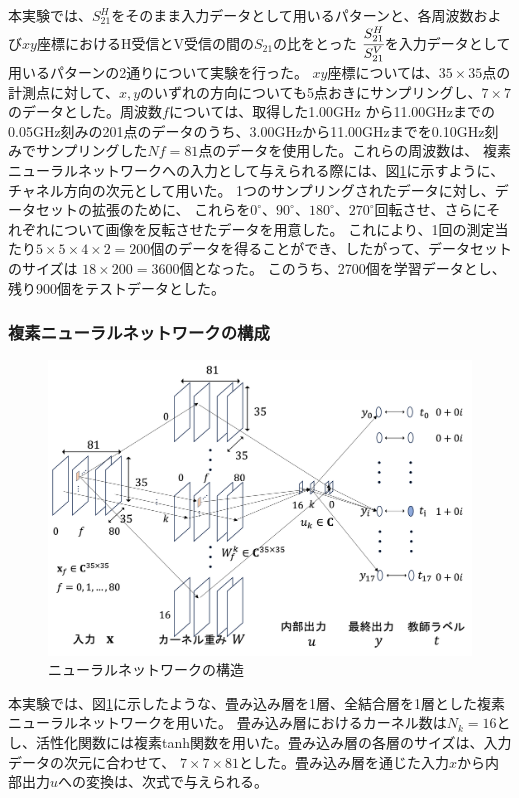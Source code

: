 \documentclass[11pt,a4paper,uplatex]{ujarticle}
\begin{document}
  本実験では、$S_{21}^{H}$をそのまま入力データとして用いるパターンと、各周波数および$xy$座標におけるH受信とV受信の間の$S_{21}$の比をとった
  $\cfrac{S_{21}^{H}}{S_{21}^{V}}$を入力データとして用いるパターンの2通りについて実験を行った。
  $xy$座標については、$35\times35$点の計測点に対して、$x,y$のいずれの方向についても5点おきにサンプリングし、$7\times7$のデータとした。周波数$f$については、取得した1.00GHz
  から11.00GHzまでの0.05GHz刻みの201点のデータのうち、3.00GHzから11.00GHzまでを0.10GHz刻みでサンプリングした$Nf = 81$点のデータを使用した。これらの周波数は、
  複素ニューラルネットワークへの入力として与えられる際には、図\ref{fig:neuralnet}に示すように、チャネル方向の次元として用いた。
  1つのサンプリングされたデータに対し、データセットの拡張のために、
  これらを$0^\circ$、$90^\circ$、$180^\circ$、$270^\circ$回転させ、さらにそれぞれについて画像を反転させたデータを用意した。
  これにより、1回の測定当たり$5\times 5 \times 4 \times 2 = 200$個のデータを得ることができ、したがって、データセットのサイズは
  $18\times 200 = 3600$個となった。
  このうち、2700個を学習データとし、残り900個をテストデータとした。
  
  \subsubsection{複素ニューラルネットワークの構成}
  \begin{figure}[hbtp]
    \centering
    \includegraphics[keepaspectratio, width=130mm]{Images/network.png}
    \caption{ニューラルネットワークの構造}
    \label{fig:neuralnet}
  \end{figure}
  本実験では、図\ref{fig:neuralnet}に示したような、畳み込み層を1層、全結合層を1層とした複素ニューラルネットワークを用いた。
  畳み込み層におけるカーネル数は$N_k = 16$とし、活性化関数には複素tanh関数を用いた。畳み込み層の各層のサイズは、入力データの次元に合わせて、
  $7\times7\times81$とした。畳み込み層を通じた入力$x$から内部出力$u$への変換は、次式で与えられる。
\end{document}
